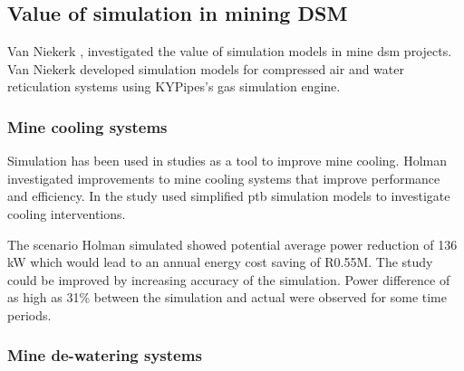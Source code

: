 		\begin{figure}[h!]
			\centering
			\fbox{}
			\caption{ }
			\label{fig: 3D Benchmark}
		\end{figure}
	\subsection{Value of simulation in mining DSM}
	Van Niekerk \cite{van2013value},\cite{vanNiekerk2012Value} investigated the value of simulation models in mine \gls{dsm} projects. Van Niekerk developed simulation models for compressed air and water reticulation systems using KYPipes's gas simulation engine. \\
	
	\subsubsection{Mine cooling systems}
	Simulation has been used in studies as a tool to improve mine cooling. Holman \cite{Holman2014Masters} investigated improvements to mine cooling systems that improve performance and efficiency. In the study \cite{Holman2014Masters}  used simplified \gls{ptb}  simulation models to investigate cooling interventions.
	\par 
	The scenario Holman simulated showed potential  average power reduction of 136 kW  which would lead to an annual energy cost saving of R0.55M. The study could be improved by increasing accuracy of the simulation. Power difference of as high as 31\% between the simulation and actual were observed for some time periods.
	\subsubsection{Mine de-watering systems}
	
